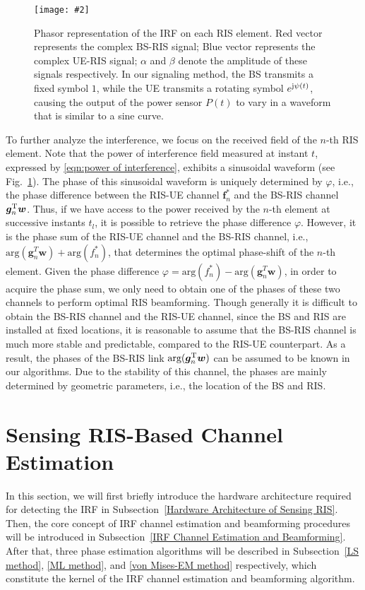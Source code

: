 \documentclass[12pt,draftclsnofoot,journal,onecolumn]{IEEEtran}
\theoremstyle{nonumberplain}
\def \arg {\text{arg}}
\newcommand{\myincludegraphics}[2][width=12cm]{\texttt{[image: \#2]}}
\begin{document}
    \begin{figure}[htbp]
        \centering
        \myincludegraphics{figures/phasor.pdf}
        \caption{Phasor representation of the \ac{IRF} on each RIS element. Red vector represents the complex BS-RIS signal; Blue vector represents the complex UE-RIS signal; $\alpha$ and $\beta$ denote the amplitude of these signals respectively. In our signaling method, the BS transmits a fixed symbol $1$, while the UE transmits a rotating symbol $e^{{\rm j}\psi(t)}$, causing the output of the power sensor $P(t)$ to vary in a waveform that is similar to a sine curve.}
        \label{fig:phasor}
    \end{figure}
    To further analyze the interference, we focus on the received field of the $n$-th RIS element. Note that the power of interference field measured at instant $t$, expressed by \eqref{eqn:power of interference}, exhibits a sinusoidal waveform (see Fig.~\ref{fig:phasor}). The phase of this sinusoidal waveform is uniquely determined by $\varphi$, i.e., the phase difference between the RIS-UE channel ${\bm f}_n^{*}$ and the BS-RIS channel ${\bm g}_n^{\rm T}{\bm w}$. Thus, if we have access to the power received by the $n$-th element at successive instants $t_l$, it is possible to retrieve the phase difference $\varphi$. However, it is the phase sum of the RIS-UE channel and the BS-RIS channel, i.e., $\arg({\bm g}_n^{T}{\bm w})+\arg(f_n^*)$, that determines the optimal phase-shift of the $n$-th element. Given the phase difference $\varphi = \arg\left(f_{n}^{*}\right)-\arg\left(\bm g_{n}^{T}\bm w\right)$, in order to acquire the phase sum, we only need to obtain one of the phases of these two channels to perform optimal RIS beamforming. Though generally it is difficult to obtain the BS-RIS channel and the RIS-UE channel, since the BS and RIS are installed at fixed locations, it is reasonable to assume that the BS-RIS channel is much more stable and predictable, compared to the RIS-UE counterpart. As a result, the phases of the BS-RIS link $\arg({\bm g}_n^{\rm T}{\bm w})$ can be assumed to be known in our algorithms. Due to the stability of this channel, the phases are mainly determined by geometric parameters, i.e., the location of the BS and RIS. 

    

\section{Sensing RIS-Based Channel Estimation}
\label{Sensing RIS-Based Channel Estimation}
In this section, we will first briefly introduce the hardware architecture required for detecting the \ac{IRF} in Subsection~\ref{Hardware Architecture of Sensing RIS}. Then, the core concept of IRF channel estimation and beamforming procedures will be introduced in Subsection~\ref{IRF Channel Estimation and Beamforming}. After that, three phase estimation algorithms will be described in Subsection~\ref{LS method}, \ref{ML method}, and \ref{von Mises-EM method} respectively, which constitute the kernel of the \ac{IRF} channel estimation and beamforming algorithm. 
\end{document}
